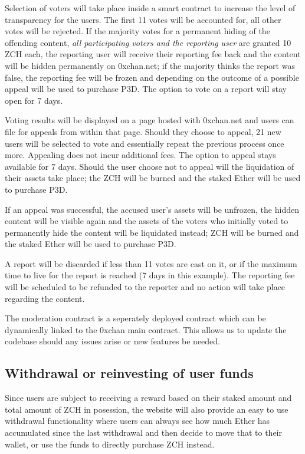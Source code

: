 \documentclass[a4paper]{article}
\newcommand{\projectname}{0xchan}
\begin{document}
Selection of voters will take place inside a smart contract to increase the level of transparency for the users. The first 11 votes will be accounted for, all other votes will be rejected. If the majority votes for a permanent hiding of the offending content, \emph{all participating voters and the reporting user} are granted 10 ZCH each, the reporting user will receive their reporting fee back and the content will be hidden permanently on 0xchan.net; if the majority thinks the report was false, the reporting fee will be frozen and depending on the outcome of a possible appeal will be used to purchase P3D. The option to vote on a report will stay open for 7 days.

Voting results will be displayed on a page hosted with 0xchan.net and users can file for appeals from within that page. Should they choose to appeal, 21 new users will be selected to vote and essentially repeat the previous process once more. Appealing does not incur additional fees. The option to appeal stays available for 7 days. Should the user choose not to appeal will the liquidation of their assets take place; the ZCH will be burned and the staked Ether will be used to purchase P3D.

If an appeal was successful, the accused user's assets will be unfrozen, the hidden content will be visible again and the assets of the voters who initially voted to permanently hide the content will be liquidated instead; ZCH will be burned and the staked Ether will be used to purchase P3D.

A report will be discarded if less than 11 votes are cast on it, or if the maximum time to live for the report is reached (7 days in this example). The reporting fee will be scheduled to be refunded to the reporter and no action will take place regarding the content.

The moderation contract is a seperately deployed contract which can be dynamically linked to the \projectname{} main contract. This allows us to update the codebase should any issues arise or new features be needed.

\subsection{Withdrawal or reinvesting of user funds}
Since users are subject to receiving a reward based on their staked amount and total amount of ZCH in posession, the website will also provide an easy to use withdrawal functionality where users can always see how much Ether has accumulated since the last withdrawal and then decide to move that to their wallet, or use the funds to directly purchase ZCH instead.
\end{document}
